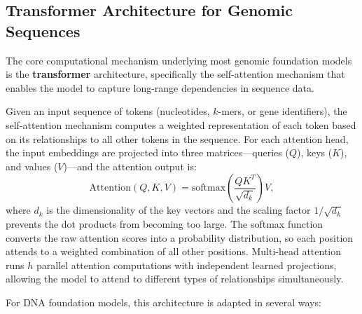 \subsection{Transformer Architecture for Genomic Sequences}
\label{subsec:emerging:transformer-architecture}

The core computational mechanism underlying most genomic foundation models is the \textbf{transformer} architecture, specifically the self-attention mechanism that enables the model to capture long-range dependencies in sequence data.

Given an input sequence of tokens (nucleotides, $k$-mers, or gene identifiers), the self-attention mechanism computes a weighted representation of each token based on its relationships to all other tokens in the sequence. For each attention head, the input embeddings are projected into three matrices---queries ($Q$), keys ($K$), and values ($V$)---and the attention output is:
\begin{equation}
  \text{Attention}(Q, K, V) = \text{softmax}\!\left(\frac{QK^T}{\sqrt{d_k}}\right) V,
  \label{eq:emerging:self-attention}
\end{equation}
where $d_k$ is the dimensionality of the key vectors and the scaling factor $1/\sqrt{d_k}$ prevents the dot products from becoming too large. The softmax function converts the raw attention scores into a probability distribution, so each position attends to a weighted combination of all other positions. Multi-head attention runs $h$ parallel attention computations with independent learned projections, allowing the model to attend to different types of relationships simultaneously.

For DNA foundation models, this architecture is adapted in several ways:

